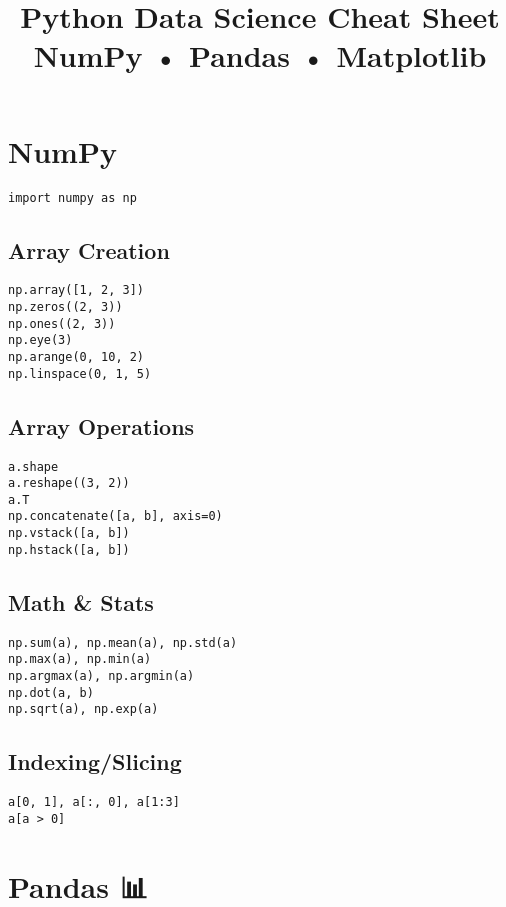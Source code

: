 \documentclass[a4paper,10pt]{article}
\title{\Huge \textbf{Python Data Science Cheat Sheet}\\[0.5em] \Large NumPy • Pandas • Matplotlib}
\author{}
\date{}
\begin{document}
\maketitle

\section*{\color{numpurple}NumPy 🧮}

\begin{tcolorbox}[colback=lightgray, title=Import]
\begin{Verbatim}[fontsize=\small]
import numpy as np
\end{Verbatim}
\end{tcolorbox}

\subsection*{Array Creation}
\begin{Verbatim}[fontsize=\small]
np.array([1, 2, 3])
np.zeros((2, 3))
np.ones((2, 3))
np.eye(3)
np.arange(0, 10, 2)
np.linspace(0, 1, 5)
\end{Verbatim}

\subsection*{Array Operations}
\begin{Verbatim}[fontsize=\small]
a.shape
a.reshape((3, 2))
a.T
np.concatenate([a, b], axis=0)
np.vstack([a, b])
np.hstack([a, b])
\end{Verbatim}

\subsection*{Math \& Stats}
\begin{Verbatim}[fontsize=\small]
np.sum(a), np.mean(a), np.std(a)
np.max(a), np.min(a)
np.argmax(a), np.argmin(a)
np.dot(a, b)
np.sqrt(a), np.exp(a)
\end{Verbatim}

\subsection*{Indexing/Slicing}
\begin{Verbatim}[fontsize=\small]
a[0, 1], a[:, 0], a[1:3]
a[a > 0]
\end{Verbatim}

\section*{\color{pandasblue}Pandas 📊}
\end{document}
